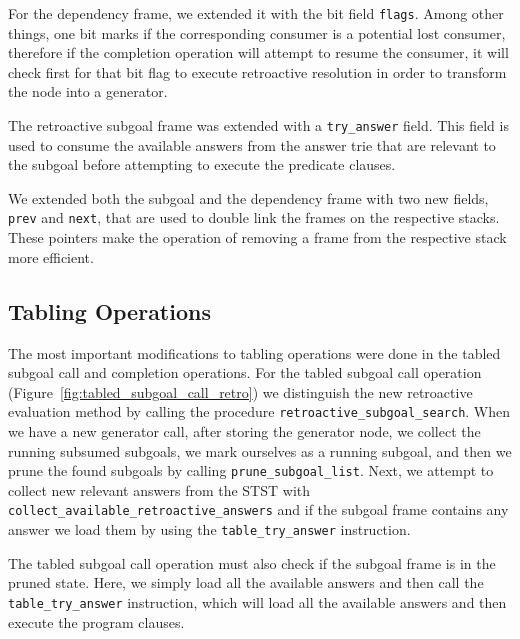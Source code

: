 For the dependency frame, we extended it with the bit field \texttt{flags}. Among other things,
one bit marks if the corresponding consumer is a potential lost consumer, therefore if the completion
operation will attempt to resume the consumer, it will check first for that bit flag to execute
retroactive resolution in order to transform the node into a generator.

The retroactive subgoal frame was extended with a \texttt{try\_answer} field. This field is used
to consume the available answers from the answer trie that are relevant to the subgoal
before attempting to execute the predicate clauses.

We extended both the subgoal and the dependency frame with two new fields, \texttt{prev} and
\texttt{next}, that are used to double link the frames on the respective stacks. These pointers
make the operation of removing a frame from the respective stack more efficient.

\subsection{Tabling Operations}

The most important modifications to tabling operations were done in the tabled subgoal call and
completion operations. For the tabled subgoal call operation (Figure~\ref{fig:tabled_subgoal_call_retro})
we distinguish the new retroactive evaluation method by calling the procedure \texttt{retroactive\_subgoal\_search}.
When we have a new generator call, after storing the
generator node, we collect the running subsumed subgoals, we mark ourselves as a running subgoal, and
then we prune the found subgoals by calling \texttt{prune\_subgoal\_list}.
Next, we attempt to collect new relevant answers from the STST with
\texttt{collect\_available\_retroactive\_answers} and if the subgoal frame contains any answer
we load them by using the \texttt{table\_try\_answer} instruction.

The tabled subgoal call operation must also check if the subgoal frame is in the pruned state. Here,
we simply load all the available answers and then call the \texttt{table\_try\_answer} instruction,
which will load all the available answers and then execute the program clauses.

